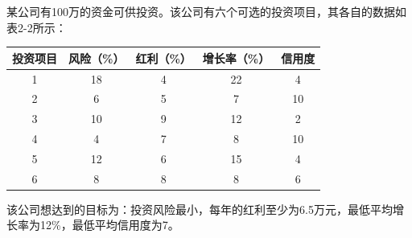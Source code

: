 \begin{frame}{\subsecname}

      \begin{example}
      某公司有100万的资金可供投资。该公司有六个可选的投资项目，其各自的数据如表2-2所示：
\begin{table}[]
\begin{tabular}{|c|c|c|c|c|}
\hline
\textbf{投资项目} & \textbf{风险（\%）} & \textbf{红利（\%）} & \textbf{增长率（\%）} & \textbf{信用度} \\ \hline
\rowcolor[HTML]{FFFFFF} 
1             & 18             & 4              & 22              & 4            \\ \hline
\rowcolor[HTML]{FFFFFF} 
2             & 6              & 5              & 7               & 10           \\ \hline
\rowcolor[HTML]{FFFFFF} 
3             & 10             & 9              & 12              & 2            \\ \hline
\rowcolor[HTML]{FFFFFF} 
4             & 4              & 7              & 8               & 10           \\ \hline
\rowcolor[HTML]{FFFFFF} 
5             & 12             & 6              & 15              & 4            \\ \hline
\rowcolor[HTML]{FFFFFF} 
6             & 8              & 8              & 8               & 6            \\ \hline
\end{tabular}
\end{table}
      该公司想达到的目标为：投资风险最小，每年的红利至少为6.5万元，最低平均增长率为12\%，最低平均信用度为7。
      \end{example}

\end{frame}

